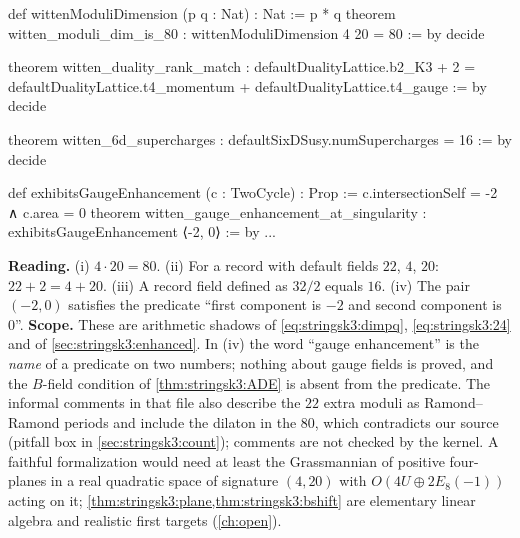 \begin{leanbox}
\begin{leancode}
def wittenModuliDimension (p q : Nat) : Nat := p * q
theorem witten_moduli_dim_is_80 :
    wittenModuliDimension 4 20 = 80 := by decide

theorem witten_duality_rank_match :
    defaultDualityLattice.b2_K3 + 2
      = defaultDualityLattice.t4_momentum + defaultDualityLattice.t4_gauge := by
  decide

theorem witten_6d_supercharges :
    defaultSixDSusy.numSupercharges = 16 := by decide

def exhibitsGaugeEnhancement (c : TwoCycle) : Prop :=
  c.intersectionSelf = -2 ∧ c.area = 0
theorem witten_gauge_enhancement_at_singularity :
    exhibitsGaugeEnhancement ⟨-2, 0⟩ := by ...
\end{leancode}
\textbf{Reading.} (i) $4\cdot20=80$. (ii) For a record with default fields $22$, $4$, $20$:
$22+2=4+20$. (iii) A record field defined as $32/2$ equals $16$. (iv) The pair $(-2,0)$
satisfies the predicate ``first component is $-2$ and second component is $0$''.
\textbf{Scope.} These are arithmetic shadows of \eqref{eq:stringsk3:dimpq},
\eqref{eq:stringsk3:24} and of \cref{sec:stringsk3:enhanced}. In (iv) the word ``gauge
enhancement'' is the \emph{name} of a predicate on two numbers; nothing about gauge fields is
proved, and the $B$-field condition of \cref{thm:stringsk3:ADE} is absent from the predicate.
The informal comments in that file also describe the $22$ extra moduli as Ramond--Ramond
periods and include the dilaton in the $80$, which contradicts our source (pitfall box in
\cref{sec:stringsk3:count}); comments are not checked by the kernel. A faithful formalization
would need at least the Grassmannian of positive four-planes in a real quadratic space of
signature $(4,20)$ with $O(4U\oplus2E_8(-1))$ acting on it;
\cref{thm:stringsk3:plane,thm:stringsk3:bshift} are elementary linear algebra and realistic
first targets (\cref{ch:open}).
\end{leanbox}


